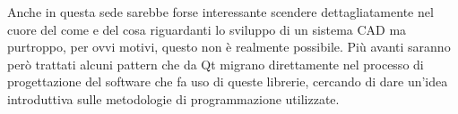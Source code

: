 Anche in questa sede sarebbe forse interessante scendere dettagliatamente nel cuore del come e del cosa riguardanti lo sviluppo di un sistema CAD ma purtroppo, per ovvi motivi, questo non è realmente possibile. Più avanti saranno però trattati alcuni pattern che da Qt migrano direttamente nel processo di progettazione del software che fa uso di queste librerie, cercando di dare un'idea introduttiva sulle metodologie di programmazione utilizzate.
